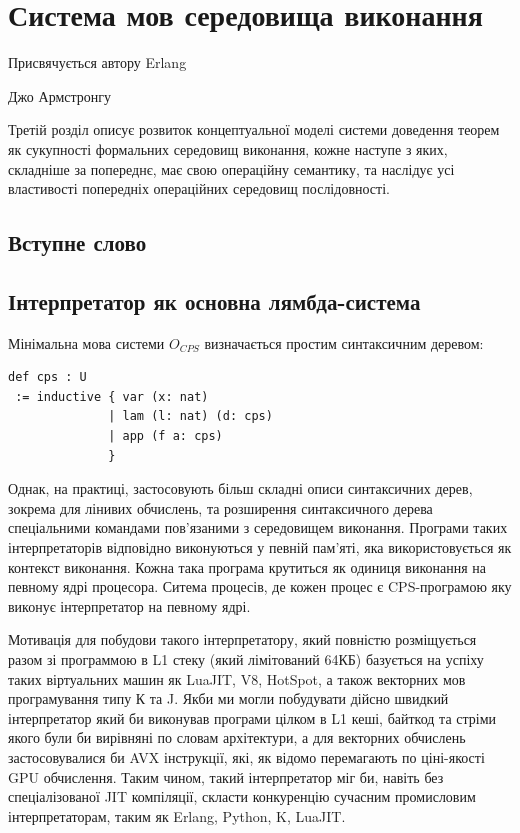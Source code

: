 \chapter{Система мов середовища виконання}
\epigraph{Присвячується автору Erlang}{Джо Армстронгу}

Третій розділ описує розвиток концептуальної моделі системи доведення теорем як сукупності
формальних середовищ виконання, кожне наступе з яких, складніше за попереднє,
має свою операційну семантику, та наслідує усі властивості попередніх операційних середовищ послідовності.

\section*{Вступне слово}

\section{Інтерпретатор як основна лямбда-система}

Мінімальна мова системи $O_{CPS}$ визначається простим
синтаксичним деревом:

\begin{lstlisting}
def cps : U
 := inductive { var (x: nat)
              | lam (l: nat) (d: cps)
              | app (f a: cps)
              }
\end{lstlisting}

Однак, на практиці, застосовують більш складні описи синтаксичних дерев,
зокрема для лінивих обчислень, та розширення синтаксичного дерева спеціальними
командами пов'язаними з середовищем виконання. Програми таких
інтерпретаторів відповідно виконуються у певній пам'яті, яка
використовується як контекст виконання. Кожна така програма крутиться
як одиниця виконання на певному ядрі процесора. Ситема процесів, де
кожен процес є CPS-програмою яку виконує інтерпретатор на певному ядрі.

Мотивація для побудови такого інтерпретатору, який повністю розміщується
разом зі программою в L1 стеку (який лімітований 64КБ) базується на успіху
таких віртуальних машин як LuaJIT, V8, HotSpot, а також векторних мов
програмування типу К та J. Якби ми могли побудувати дійсно швидкий інтерпретатор
який би виконував програми цілком в L1 кеші, байткод та стріми якого були би
вирівняні по словам архітектури, а для векторних обчислень застосовувалися би AVX інструкції,
які, як відомо перемагають по ціні-якості GPU обчислення. Таким чином, такий
інтерпретатор міг би, навіть без спеціалізованої JIT компіляції, скласти
конкуренцію сучасним промисловим інтерпретаторам, таким як Erlang, Python, K, LuaJIT.

